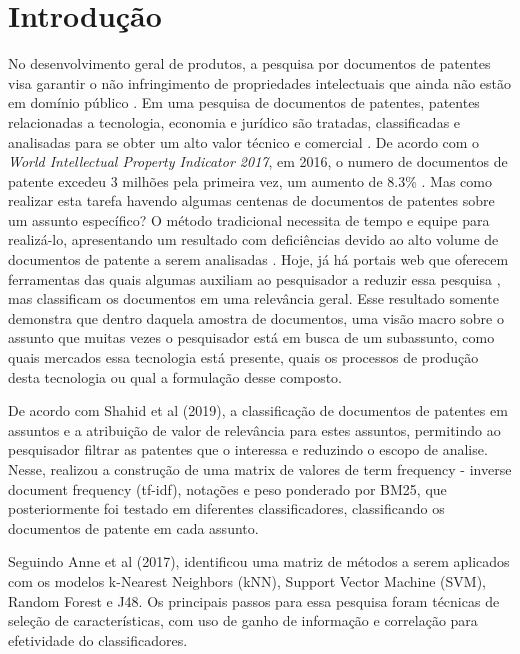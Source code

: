 
\chapter[Introdução]{Introdução}


No desenvolvimento geral de produtos, a pesquisa por documentos de patentes visa garantir o não infringimento de propriedades intelectuais que ainda não estão em domínio público \cite{Breitzman2002}. Em uma pesquisa de documentos de patentes, patentes relacionadas a tecnologia, economia e jurídico são tratadas, classificadas e analisadas para se obter um alto valor técnico e comercial \cite{Li2018}. De acordo com o \textit{World Intellectual Property Indicator 2017}, em 2016, o numero de documentos de patente excedeu 3 milhões pela primeira vez, um aumento de 8.3\% \cite{Li2018}. Mas como realizar esta tarefa havendo algumas centenas de documentos de patentes sobre um assunto específico? O método tradicional necessita de tempo e equipe para realizá-lo, apresentando um resultado com deficiências devido ao alto volume de documentos de patente a serem analisadas \cite{Li2018}. Hoje, já há portais web que oferecem ferramentas das quais algumas auxiliam ao pesquisador a reduzir essa pesquisa \cite{Abbas2014}, mas classificam os documentos em uma relevância geral. Esse resultado somente demonstra que dentro daquela amostra de documentos, uma visão macro sobre o assunto que muitas vezes o pesquisador está em busca de um subassunto, como quais mercados essa tecnologia está presente, quais os processos de produção desta tecnologia ou qual a formulação desse composto.

De acordo com Shahid et al (2019), a classificação de documentos de patentes em assuntos e a atribuição de valor de relevância para estes assuntos, permitindo ao pesquisador filtrar as patentes que o interessa e reduzindo o escopo de analise. Nesse, realizou a construção de uma matrix de valores de term frequency - inverse document frequency (tf-idf), notações e peso ponderado por BM25, que posteriormente foi testado em diferentes classificadores, classificando os documentos de patente em cada assunto.

Seguindo Anne et al (2017), identificou uma matriz de métodos a serem aplicados com os modelos k-Nearest Neighbors (kNN),  Support Vector Machine (SVM), Random Forest e J48. Os principais passos para essa pesquisa foram técnicas de seleção de características, com uso de ganho de informação e correlação para efetividade do classificadores.

